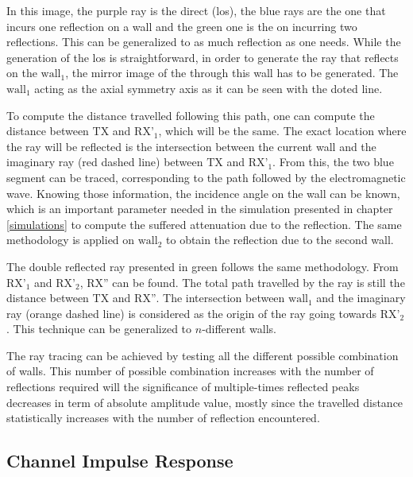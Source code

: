 In this image, the purple ray is the direct (\gls{los}), the blue rays are the one that incurs one reflection on a wall and the green one is the on incurring two reflections. This can be generalized to as much reflection as one needs. While the generation of the \gls{los} is straightforward, in order to generate the ray that reflects on the $\text{wall}_\text{1}$, the mirror image of the  through this wall has to be generated. The $\text{wall}_\text{1}$ acting as the axial symmetry axis as it can be seen with the doted line.
\vspace{2mm}

To compute the distance travelled following this path, one can compute the distance between $\text{TX}$ and $\text{RX'}_\text{1}$, which will be the same. The exact location where the ray will be reflected is the intersection between the current wall and the imaginary ray (red dashed line) between $\text{TX}$ and $\text{RX'}_\text{1}$. From this, the two blue segment can be traced, corresponding to the path followed by the electromagnetic wave. Knowing those information, the incidence angle on the wall can be known, which is an important parameter needed in the simulation presented in chapter \ref{simulations} to compute the suffered attenuation due to the reflection. The same methodology is applied on $\text{wall}_\text{2}$ to obtain the reflection due to the second wall.
\vspace{2mm}

The double reflected ray presented in green follows the same methodology. From 
$\text{RX'}_\text{1}$ and $\text{RX'}_\text{2}$, $\text{RX''}$ can be found. The total path travelled by the ray is still the distance between $\text{TX}$ and $\text{RX''}$. The intersection between $\text{wall}_\text{1}$ and the imaginary ray (orange dashed line) is considered as the origin of the ray going towards $\text{RX'}_\text{2}$. This technique can be generalized to $n$-different walls.
\vspace{2mm}

The ray tracing can be achieved by testing all the different possible combination of walls. This number of possible combination increases with the number of reflections required will the significance of multiple-times reflected peaks decreases in term of absolute amplitude value, mostly since the travelled distance statistically increases with the number of reflection encountered.

\subsection{Channel Impulse Response}
\label{mp_cir}

